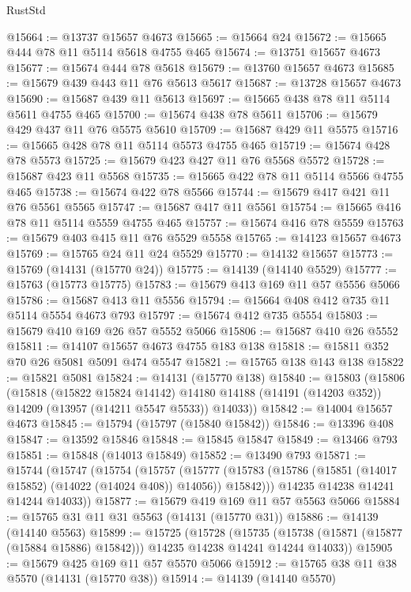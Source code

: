 \begin{lexlean}{RustStd}
\begin{coremodule}
@15664 := @13737 @15657 @4673
@15665 := @15664 @24
@15672 := @15665 @444 @78 @11 @5114 @5618 @4755 @465
@15674 := @13751 @15657 @4673
@15677 := @15674 @444 @78 @5618
@15679 := @13760 @15657 @4673
@15685 := @15679 @439 @443 @11 @76 @5613 @5617
@15687 := @13728 @15657 @4673
@15690 := @15687 @439 @11 @5613
@15697 := @15665 @438 @78 @11 @5114 @5611 @4755 @465
@15700 := @15674 @438 @78 @5611
@15706 := @15679 @429 @437 @11 @76 @5575 @5610
@15709 := @15687 @429 @11 @5575
@15716 := @15665 @428 @78 @11 @5114 @5573 @4755 @465
@15719 := @15674 @428 @78 @5573
@15725 := @15679 @423 @427 @11 @76 @5568 @5572
@15728 := @15687 @423 @11 @5568
@15735 := @15665 @422 @78 @11 @5114 @5566 @4755 @465
@15738 := @15674 @422 @78 @5566
@15744 := @15679 @417 @421 @11 @76 @5561 @5565
@15747 := @15687 @417 @11 @5561
@15754 := @15665 @416 @78 @11 @5114 @5559 @4755 @465
@15757 := @15674 @416 @78 @5559
@15763 := @15679 @403 @415 @11 @76 @5529 @5558
@15765 := @14123 @15657 @4673
@15769 := @15765 @24 @11 @24 @5529
@15770 := @14132 @15657
@15773 := @15769 (@14131 (@15770 @24))
@15775 := @14139 (@14140 @5529)
@15777 := @15763 (@15773 @15775)
@15783 := @15679 @413 @169 @11 @57 @5556 @5066
@15786 := @15687 @413 @11 @5556
@15794 := @15664 @408 @412 @735 @11 @5114 @5554 @4673 @793
@15797 := @15674 @412 @735 @5554
@15803 := @15679 @410 @169 @26 @57 @5552 @5066
@15806 := @15687 @410 @26 @5552
@15811 := @14107 @15657 @4673 @4755 @183 @138
@15818 := @15811 @352 @70 @26 @5081 @5091 @474 @5547
@15821 := @15765 @138 @143 @138
@15822 := @15821 @5081
@15824 := @14131 (@15770 @138)
@15840 := @15803
    (@15806
      (@15818
        (@15822 @15824 @14142)
        @14180
        @14188
        (@14191 (@14203 @352))
        @14209
        (@13957 (@14211 @5547 @5533))
        @14033))
@15842 := @14004 @15657 @4673
@15845 := @15794 (@15797 (@15840 @15842))
@15846 := @13396 @408
@15847 := @13592 @15846
@15848 := @15845 @15847
@15849 := @13466 @793
@15851 := @15848 (@14013 @15849)
@15852 := @13490 @793
@15871 := @15744
    (@15747
      (@15754
        (@15757
          (@15777 (@15783 (@15786 (@15851 (@14017 @15852) (@14022 (@14024 @408)) @14056)) @15842)))
        @14235
        @14238
        @14241
        @14244
        @14033))
@15877 := @15679 @419 @169 @11 @57 @5563 @5066
@15884 := @15765 @31 @11 @31 @5563 (@14131 (@15770 @31))
@15886 := @14139 (@14140 @5563)
@15899 := @15725
    (@15728
      (@15735 (@15738 (@15871 (@15877 (@15884 @15886) @15842))) @14235 @14238 @14241 @14244 @14033))
@15905 := @15679 @425 @169 @11 @57 @5570 @5066
@15912 := @15765 @38 @11 @38 @5570 (@14131 (@15770 @38))
@15914 := @14139 (@14140 @5570)

\end{coremodule}
\end{lexlean}
